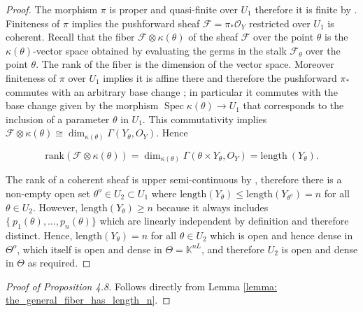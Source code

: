 \documentclass[final]{article}
\newcommand{\K}{\mathbb{K}}
\newcommand{\rank}{\text{rank}}
\theoremstyle{definition}
\theoremstyle{plain}
\begin{document}
\begin{proof}
    The morphism $\pi$ is proper and quasi-finite over $U_1$ therefore it is finite by \cite[\href{https://stacks.math.columbia.edu/tag/02LS}{Lemma 02LS}]{stacks-project}. 
    Finiteness of $\pi$ implies the pushforward sheaf $\mathcal{F} = \pi_* \mathcal{O}_Y$ restricted over $U_1$  is coherent.
    Recall that the fiber $\mathcal{F} \otimes \kappa(\theta)$ of the sheaf $\mathcal{F}$ over the  point $\theta$ is the $\kappa(\theta)$-vector space obtained by evaluating the germs in the stalk $\mathcal{F}_\theta$ over the point $\theta$. 
    The rank of the fiber is the dimension of the vector space.
    Moreover finiteness of $\pi$ over $U_1$ implies it is affine there and therefore the pushforward $\pi_{*}$ commutes with an arbitrary base change \cite[\href{https://stacks.math.columbia.edu/tag/02KG}{Lemma 02KG}]{stacks-project}; in particular it commutes with the base change given by the morphism $\operatorname{Spec} \kappa(\theta) \to U_1$ that corresponds to the inclusion of a parameter $\theta$ in $U_1$.
    This commutativity implies $\mathcal{F}\otimes \kappa(\theta) \cong \dim_{\kappa(\theta)}\Gamma(Y_\theta, O_Y)$. Hence
    
    \[
    \rank(\mathcal{F} \otimes \kappa(\theta)) = \dim_{\kappa(\theta)}\Gamma({\theta}\times Y_\theta, O_Y) = \text{length}\ (Y_\theta). 
    \]

    The rank of a coherent sheaf is upper semi-continuous by \cite[\href{https://stacks.math.columbia.edu/tag/07ZC}{Lemma 07ZC}]{stacks-project}, therefore there is a non-empty open set $\theta^o \in U_2 \subset U_1$ where $\text{length} (Y_\theta)\leq \text{length}(Y_{\theta^o}) = n$ for all $\theta \in U_2$. However, $\text{length}(Y_\theta) \geq n$ because it always includes $\{\ p_1(\theta), \dots, p_n(\theta)\}$ which are linearly independent by definition and therefore distinct. Hence, $\text{length}(Y_\theta) = n$ for all $\theta \in U_2$ which is open and hence dense in $\Theta^o$, which itself is open and dense in $\Theta = \K^{nL}$, and therefore $U_2$ is open and dense in $\Theta$ as required.
\end{proof}

\begin{proof}[Proof of Proposition 4.8]
    Follows directly from Lemma \ref{lemma: the_general_fiber_has_length_n}.
\end{proof}
\end{document}
